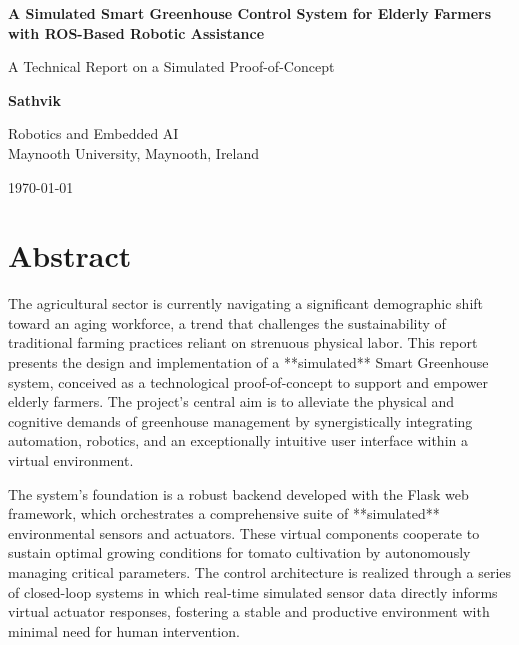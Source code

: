 \documentclass[12pt, a4paper]{report}
\begin{document}
\begin{titlepage}
    \centering
    \vspace*{1cm}
    
    \huge
    \textbf{A Simulated Smart Greenhouse Control System for Elderly Farmers with ROS-Based Robotic Assistance}
    
    \vspace{1.5cm}
    
    \Large
    A Technical Report on a Simulated Proof-of-Concept
    
    \vspace{2cm}
    
    \textbf{Sathvik}

    \vspace{0.3cm}

    \large
    Robotics and Embedded AI \\
    Maynooth University, Maynooth, Ireland

    \vfill
    
    \Large
    \today
    
\end{titlepage}

\tableofcontents

\chapter*{Abstract}
\setcounter{page}{1}

The agricultural sector is currently navigating a significant demographic shift toward an aging workforce, a trend that challenges the sustainability of traditional farming practices reliant on strenuous physical labor. This report presents the design and implementation of a **simulated** Smart Greenhouse system, conceived as a technological proof-of-concept to support and empower elderly farmers. The project’s central aim is to alleviate the physical and cognitive demands of greenhouse management by synergistically integrating automation, robotics, and an exceptionally intuitive user interface within a virtual environment.

The system's foundation is a robust backend developed with the Flask web framework, which orchestrates a comprehensive suite of **simulated** environmental sensors and actuators. These virtual components cooperate to sustain optimal growing conditions for tomato cultivation by autonomously managing critical parameters. The control architecture is realized through a series of closed-loop systems in which real-time simulated sensor data directly informs virtual actuator responses, fostering a stable and productive environment with minimal need for human intervention.
\end{document}
